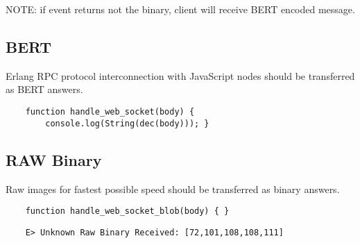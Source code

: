 NOTE: if event returns not the binary, client will receive BERT encoded message.

\subsection*{BERT}

Erlang RPC protocol interconnection with JavaScript nodes should be transferred as BERT answers.

\begin{lstlisting}
    function handle_web_socket(body) {
        console.log(String(dec(body))); }
\end{lstlisting}

\subsection*{RAW Binary}

Raw images for fastest possible speed should be transferred as binary answers.

\begin{lstlisting}
    function handle_web_socket_blob(body) { }
\end{lstlisting}

\begin{lstlisting}
    E> Unknown Raw Binary Received: [72,101,108,108,111]
\end{lstlisting}

